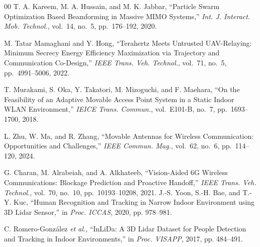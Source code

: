 \documentclass[conference]{IEEEtran}
\begin{document}
\begin{thebibliography}{00}
		T. A. Kareem, M. A. Hussain, and M. K. Jabbar,
		``Particle Swarm Optimization Based Beamforming in Massive MIMO
		Systems,'' \textit{Int. J. Interact. Mob. Technol.}, vol.~14,
		no.~5, pp.~176--192, 2020.

		M. Tatar Mamaghani and Y. Hong, ``Terahertz Meets Untrusted UAV-Relaying:
		Minimum Secrecy Energy Efficiency Maximization via Trajectory and
		Communication Co-Design,'' \textit{IEEE Trans. Veh. Technol.},
		vol.~71, no.~5, pp.~4991--5006, 2022.

		T. Murakami, S. Oka, Y. Takatori, M. Mizoguchi, and F. Maehara,
		``On the Feasibility of an Adaptive Movable Access Point System in a
		Static Indoor WLAN Environment,'' \textit{IEICE Trans. Commun.},
		vol.~E101-B, no.~7, pp.~1693--1700, 2018.

		L. Zhu, W. Ma, and R. Zhang, ``Movable Antennas for Wireless
		Communication: Opportunities and Challenges,'' \textit{IEEE Commun.
			Mag.}, vol.~62, no.~6, pp.~114--120, 2024.

		G. Charan, M. Alrabeiah, and A. Alkhateeb, ``Vision-Aided 6G
		Wireless Communications: Blockage Prediction and Proactive Handoff,''
		\textit{IEEE Trans. Veh. Technol.}, vol.~70, no.~10,
		pp.~10193--10208, 2021.
		J.-S. Yoon, S.-H. Bae, and T.-Y. Kuc, ``Human Recognition and Tracking in Narrow Indoor Environment using 3D Lidar Sensor,'' in \textit{Proc. ICCAS}, 2020, pp. 978--981.

		C. Romero-Gonz\'alez \textit{et al.}, ``InLiDa: A 3D Lidar Dataset for People Detection and Tracking in Indoor Environments,'' in \textit{Proc. VISAPP}, 2017, pp. 484--491.

	\end{thebibliography}
\end{document}
